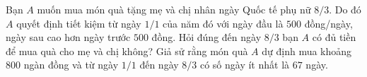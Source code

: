 \begin{bt}%
	Bạn $A$ muốn mua món quà tặng mẹ và chị nhân ngày Quốc tế phụ nữ $8/3$. Do đó $A$ quyết định tiết kiệm từ ngày $1/1$ của năm đó với ngày đầu là $500$ đồng/ngày, ngày sau cao hơn ngày trước $ 500$ đồng. Hỏi đúng đến ngày $8/3$ bạn $A$ có đủ tiền để mua quà cho mẹ và chị không? Giả sử rằng món quà $A$ dự  định mua khoảng $800$ ngàn đồng và từ ngày $1/1$ đến ngày $8/3$ có số ngày ít nhất là $67$ ngày.
\end{bt}

